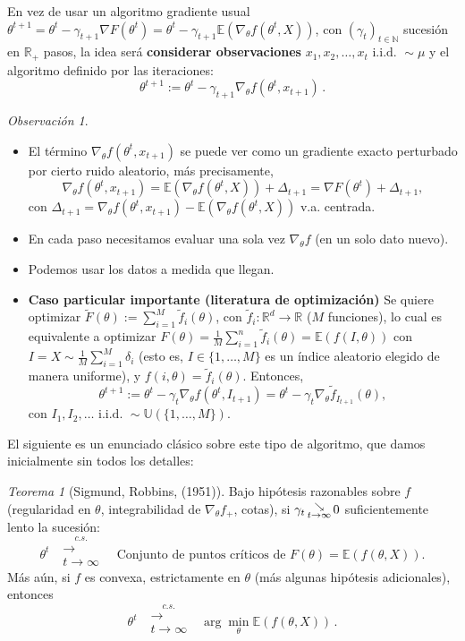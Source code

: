 \documentclass[letterpaper,11pt]{article} %
\theoremstyle{defbreak}
\theoremstyle{propbreak}
\theoremstyle{remark}
\newtheorem{remark}{Observación}[subsection]
\theoremstyle{break}
\newtheorem{theorem}{Teorema}[subsection]
\def\ssi{\Longleftrightarrow}
\def\R{\mathbb{R}}
\def\E{\mathbb{E}}
\def\N{\mathbb{N}}
\def\iid{\mbox{ i.i.d. }}
\def\beforeitemize{\leavevmode \vspace{-0.5\baselineskip}}
\begin{document}
En vez de usar un algoritmo gradiente usual $\theta^{t+1}=\theta^t-\gamma_{t+1}\nabla F(\theta^t)=\theta^t-\gamma_{t+1}\E(\nabla_\theta f(\theta^t,X))$, con $(\gamma_t)_{t\in\N}$ sucesión en $\R_+$ pasos, la idea ser\'a \textbf{considerar observaciones} $x_1,x_2,\dots,x_t \iid \sim\mu$ y el algoritmo definido por las iteraciones: 
$$ \theta^{t+1}:=\theta^t-\gamma_{t+1}\nabla_\theta f(\theta^t,x_{t+1})\,.$$
\begin{remark}
\beforeitemize
\begin{itemize}
    \item El término $\nabla_\theta f(\theta^t,x_{t+1})$ se puede ver como un gradiente exacto perturbado por cierto ruido aleatorio, m\'as precisamente, 
    $$ \nabla_\theta f(\theta^t,x_{t+1})=\E(\nabla_\theta f(\theta^t,X))+\Delta_{t+1}=\nabla F(\theta^t)+\Delta_{t+1},$$
    con $\Delta_{t+1}=\nabla_\theta f(\theta^t,x_{t+1})-\E(\nabla_\theta f(\theta^t,X))$  v.a. centrada. 
    \item En cada paso necesitamos evaluar una sola vez $\nabla_\theta f$ (en un solo dato nuevo).
    \item Podemos usar los datos a medida que llegan.
    \item \textbf{Caso particular importante (literatura de optimización)}
    \newline Se quiere optimizar $\tilde{F}(\theta):=\displaystyle\sum^M_{i=1}\tilde{f}_i(\theta)$, con $\tilde{f}_i:\R^d\to\R$ ($M$ funciones), lo cual es equivalente a
    optimizar $F(\theta)=\displaystyle\frac{1}{M}\sum^n_{i=1}\tilde{f}_i(\theta)=\E(f(I,\theta))$ con $I=X\sim \frac{1}{M}\sum^M_{i=1}\delta_i$ (esto es,  $I\in\{1,\dots,M\}$ es un índice  aleatorio  elegido de manera uniforme), y $f(i,\theta)=\tilde{f}_i(\theta)$.  Entonces, 
    $$ \theta^{t+1}:=\theta^t-\gamma_t \nabla_\theta f(\theta^t,I_{t+1})=\theta^t-\gamma_t \nabla_\theta\tilde{f}_{I_{t+1}}(\theta), $$
    con $I_1,I_2,\dots \iid\sim\mathbb{U}(\{1,\dots,M\})$.
\end{itemize}
\end{remark}
El siguiente es un enunciado cl\'asico sobre este tipo de algoritmo, que damos inicialmente sin todos los detalles: 
\begin{theorem}[Sigmund, Robbins, (1951)] 
Bajo hipótesis razonables sobre $f$ (regularidad en $\theta$, integrabilidad de $\nabla_\theta f_+$, cotas), si $\gamma_t\,\substack{\searrow \\ \tiny{t\to\infty}}\, 0$ suficientemente lento la sucesión:
$$ \theta^t\mbox{ }\overset{c.s.}{\substack{\longrightarrow \\t \to \infty}}\mbox{ }\mbox{ Conjunto de puntos críticos de } F(\theta)=\E(f(\theta,X)).$$
Más aún, si $f$ es convexa,  estrictamente en $\theta$ (más algunas hipótesis adicionales), entonces
$$ \theta^t\mbox{ }\overset{c.s.}{\substack{\longrightarrow \\t \to \infty}}\mbox{ }\arg\min_\theta \E(f(\theta,X))\,.$$
\end{theorem}
\end{document}

